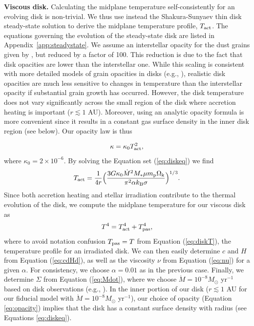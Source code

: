 \documentclass[apj]{emulateapj}
\newcommand{\App}[1]{Appendix~\ref{#1}}
\begin{document}
\textbf{Viscous disk.} %
Calculating the midplane temperature self-consistently for an evolving disk is non-trivial. We thus use instead the Shakura-Sunyaev thin disk steady-state solution to derive the midplane temperature profile, $T_{\rm act}$. The equations governing the evolution of the steady-state disk are listed in \App{app:steadystate}. We assume an interstellar opacity for the dust grains given by \citet{bell94}, but reduced by a factor of 100. This reduction is due to the fact that disk opacities are lower than the interstellar one. While this scaling is consistent with more detailed models of grain opacities in disks (e.g., \citealt{mordasini14}), realistic disk opacities are much less sensitive to changes in temperature than the interstellar opacity if substantial grain growth has occurred. However, the disk temperature does not vary significantly across the small region of the disk where accretion heating is important ($r \lesssim 1$ AU). Moreover, using an analytic opacity formula is more convenient since it results in a constant gas surface density in the inner disk region (see below). Our opacity law is thus

\begin{equation}
\label{eq:opacity}
\kappa=\kappa_0 T_{\rm act}^2,
\end{equation}
where $\kappa_0=2 \times 10^{-6}$. By solving the Equation set (\ref{eq:diskeq}) we find
\begin{equation}
\label{eq:Tdact}
T_{\rm act}=\frac{1}{4 r} \Big(\frac{3 G \kappa_0\dot{M}^2 M_* \mu m_{\rm p} \Omega_{\rm k}}{\pi^2 \alpha k_{\rm B} \sigma}\Big)^{1/3}.
\end{equation}
Since both accretion heating and stellar irradiation contribute to the thermal evolution of the disk, we compute the midplane temperature for our viscous disk as
\begin{equation}
\label{eq:activeT}
T^4 = T_{\rm act}^4 + T_{\rm pas}^4,
\end{equation}
where to avoid notation confusion $T_{\rm pas}=T$ from Equation (\ref{eq:diskT}), the temperature profile for an irradiated disk. We can then easily determine  $c$ and $H$ from Equation (\ref{eq:cdHd}), as well as the viscosity $\nu$ from Equation (\ref{eq:nu}) for a given $\alpha$. For consistency, we choose  $\alpha=0.01$ as in the previous case. Finally, we determine $\Sigma$ from Equation (\ref{eq:Mdot}), where we choose $\dot{M}=10^{-8} M_{\odot}$ yr$^{-1}$ based on disk observations (e.g., \citealt{andrews10}). In the inner portion of our disk ($r  \lesssim 1$ AU for our fiducial model with $\dot{M}=10^{-8} M_{\odot}$ yr$^{-1}$), our choice of opacity (Equation \ref{eq:opacity}) implies that the disk has a constant surface density with radius (see Equations \ref{eq:diskeq}). %
\end{document}

